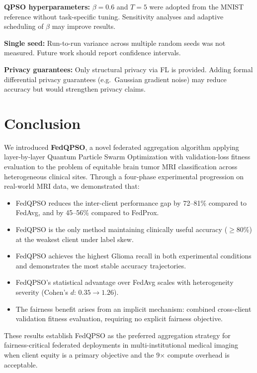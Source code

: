 \documentclass[conference]{IEEEtran}
\begin{document}
\textbf{QPSO hyperparameters:} $\beta = 0.6$ and $T = 5$ were adopted from
the MNIST reference \cite{edla2025mnist} without task-specific tuning.
Sensitivity analyses and adaptive scheduling of $\beta$ may improve results.

\textbf{Single seed:} Run-to-run variance across multiple random seeds was not
measured. Future work should report confidence intervals.

\textbf{Privacy guarantees:} Only structural privacy via FL is provided. Adding
formal differential privacy guarantees (e.g.\ Gaussian gradient noise) may
reduce accuracy but would strengthen privacy claims.

\section{Conclusion}
\label{sec:conclusion}

We introduced \textbf{FedQPSO}, a novel federated aggregation algorithm
applying layer-by-layer Quantum Particle Swarm Optimization with
validation-loss fitness evaluation to the problem of equitable brain tumor MRI
classification across heterogeneous clinical sites. Through a four-phase
experimental progression on real-world MRI data, we demonstrated that:

\begin{itemize}
    \item FedQPSO reduces the inter-client performance gap by 72--81\% compared
    to FedAvg, and by 45--56\% compared to FedProx.
    \item FedQPSO is the only method maintaining clinically useful accuracy
    ($\geq$80\%) at the weakest client under label skew.
    \item FedQPSO achieves the highest Glioma recall in both experimental
    conditions and demonstrates the most stable accuracy trajectories.
    \item FedQPSO's statistical advantage over FedAvg scales with heterogeneity
    severity (Cohen's $d$: $0.35 \to 1.26$).
    \item The fairness benefit arises from an implicit mechanism: combined
    cross-client validation fitness evaluation, requiring no explicit fairness
    objective.
\end{itemize}

These results establish FedQPSO as the preferred aggregation strategy for
fairness-critical federated deployments in multi-institutional medical imaging
when client equity is a primary objective and the 9$\times$ compute overhead
is acceptable.
\end{document}
